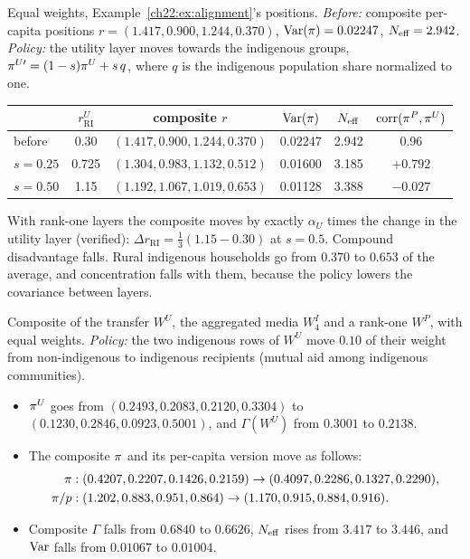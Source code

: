 \documentclass[../solutions_manual.tex]{subfiles}
\begin{document}
 Equal weights, Example~\ref{ch22:ex:alignment}'s positions. \emph{Before:} composite per-capita positions $r = (1.417, 0.900, 1.244, 0.370)$, $\operatorname{Var}(\pi) = 0.02247$, $N_{\text{eff}} = 2.942$. \emph{Policy:} the utility layer moves towards the indigenous groups, $\pi^{U\prime} = (1-s)\pi^U + s\,q$, where $q$ is the indigenous population share normalized to one.
\begin{center}\small
\begin{tabular}{lccccc}
\toprule
& $r^U_{\text{RI}}$ & composite $r$ & $\operatorname{Var}(\pi)$ & $N_{\text{eff}}$ & $\operatorname{corr}(\pi^P,\pi^U)$ \\
\midrule
before & 0.30 & $(1.417, 0.900, 1.244, 0.370)$ & 0.02247 & 2.942 & 0.96 \\
$s = 0.25$ & 0.725 & $(1.304, 0.983, 1.132, 0.512)$ & 0.01600 & 3.185 & $+0.792$ \\
$s = 0.50$ & 1.15 & $(1.192, 1.067, 1.019, 0.653)$ & 0.01128 & 3.388 & $-0.027$ \\
\bottomrule
\end{tabular}
\end{center}
With rank-one layers the composite moves by exactly $\alpha_U$ times the change in the utility layer (verified): $\Delta r_{\text{RI}} = \tfrac13(1.15 - 0.30)$ at $s = 0.5$. Compound disadvantage falls. Rural indigenous households go from $0.370$ to $0.653$ of the average, and concentration falls with them, because the policy lowers the covariance between layers.

 Composite of the transfer $W^U$, the aggregated media $W^I_4$ and a rank-one $W^P$, with equal weights. \emph{Policy:} the two indigenous rows of $W^U$ move $0.10$ of their weight from non-indigenous to indigenous recipients (mutual aid among indigenous communities).
\begin{itemize}
\item $\pi^U$ goes from $(0.2493, 0.2083, 0.2120, 0.3304)$ to $(0.1230, 0.2846, 0.0923, 0.5001)$, and $\Gamma(W^U)$ from $0.3001$ to $0.2138$.
\item The composite $\pi$ and its per-capita version move as follows:
\begin{align*}
\pi &: (0.4207, 0.2207, 0.1426, 0.2159) \to (0.4097, 0.2286, 0.1327, 0.2290),\\
\pi/p &: (1.202, 0.883, 0.951, 0.864) \to (1.170, 0.915, 0.884, 0.916).
\end{align*}
\item Composite $\Gamma$ falls from $0.6840$ to $0.6626$, $N_{\text{eff}}$ rises from $3.417$ to $3.446$, and $\operatorname{Var}$ falls from $0.01067$ to $0.01004$.
\end{itemize}
\end{document}
